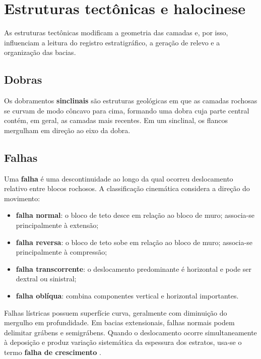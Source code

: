 \section{Estruturas tectônicas e halocinese}

As estruturas tectônicas modificam a geometria das camadas e, por isso, influenciam a leitura do registro estratigráfico, a geração de relevo e a organização das bacias.

\subsection{Dobras}
\begin{definicao}

Os dobramentos \textbf{sinclinais} são estruturas geológicas em que as camadas rochosas se curvam de modo côncavo para cima, formando uma dobra cuja parte central contém, em geral, as camadas mais recentes. Em um sinclinal, os flancos mergulham em direção ao eixo da dobra.

\end{definicao}

\subsection{Falhas}

Uma \textbf{falha} é uma descontinuidade ao longo da qual ocorreu deslocamento relativo entre blocos rochosos. A classificação cinemática considera a direção do movimento:

\begin{itemize}
  \item \textbf{falha normal}: o bloco de teto desce em relação ao bloco de muro; associa-se principalmente à extensão;
  \item \textbf{falha reversa}: o bloco de teto sobe em relação ao bloco de muro; associa-se principalmente à compressão;
  \item \textbf{falha transcorrente}: o deslocamento predominante é horizontal e pode ser dextral ou sinistral;
  \item \textbf{falha oblíqua}: combina componentes vertical e horizontal importantes.
\end{itemize}

Falhas lístricas possuem superfície curva, geralmente com diminuição do mergulho em profundidade. Em bacias extensionais, falhas normais podem delimitar grábens e semigrábens. Quando o deslocamento ocorre simultaneamente à deposição e produz variação sistemática da espessura dos estratos, usa-se o termo \textbf{falha de crescimento} \parencite{fossen2016}.

